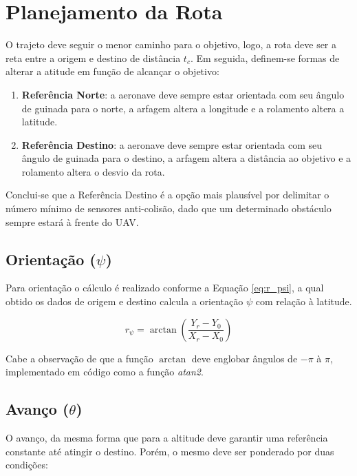 \documentclass[main.tex]{subfiles}
\begin{document}
\section{Planejamento da Rota}

O trajeto deve seguir o menor caminho para o objetivo, logo, a rota deve ser a reta entre a origem e destino de distância $t_c$. Em seguida, definem-se formas de alterar a atitude em função de alcançar o objetivo:

\begin{enumerate}
    \item \textbf{Referência Norte}: a aeronave deve sempre estar orientada com seu ângulo de guinada para o norte, a arfagem altera a longitude e a rolamento altera a latitude.
    \item \textbf{Referência Destino}: a aeronave deve sempre estar orientada com seu ângulo de guinada para o destino, a arfagem altera a distância ao objetivo e a rolamento altera o desvio da rota.
\end{enumerate}

Conclui-se que a Referência Destino é a opção mais plausível por delimitar o número mínimo de sensores anti-colisão, dado que um determinado obstáculo sempre estará à frente do UAV.

\subsection{Orientação ($\psi$)}

Para orientação o cálculo é realizado conforme a Equação \ref{eq:r_psi}, a qual obtido os dados de origem e destino calcula a orientação $\psi$ com relação à latitude.

\begin{equation}\label{eq:r_psi}
    r_\psi = \arctan{\left(\frac{Y_r - Y_0}{X_r - X_0}\right)}
\end{equation}

Cabe a observação de que a função $\arctan$ deve englobar ângulos de $-\pi$ à $\pi$, implementado em código como a função \textit{atan2}.

\subsection{Avanço ($\theta$)}

O avanço, da mesma forma que para a altitude deve garantir uma referência constante até atingir o destino. Porém, o mesmo deve ser ponderado por duas condições:
\end{document}
